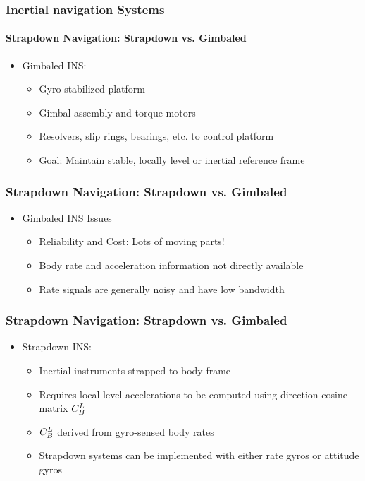 \begin{frame}
\frametitle{Inertial navigation Systems}
\framesubtitle{Strapdown Navigation:  Strapdown vs. Gimbaled}
\begin{itemize}
  \item Gimbaled INS:
  \begin{itemize}
	\item Gyro stabilized platform
	\item Gimbal assembly and torque motors
	\item Resolvers, slip rings, bearings, etc. to control  platform
	\item Goal: Maintain stable, locally level or inertial reference frame
  \end{itemize}
\end{itemize} 
\end{frame}


\begin{frame}
\frametitle{Strapdown Navigation: Strapdown vs. Gimbaled}
\begin{itemize}
  \item Gimbaled INS Issues
  \begin{itemize}
	\item Reliability and Cost: Lots of moving parts!
	\item Body rate and acceleration information not directly available
	\item Rate signals are generally noisy and have low bandwidth
  \end{itemize}
\end{itemize} 
\end{frame}


\begin{frame}
\frametitle{Strapdown Navigation: Strapdown vs. Gimbaled}
\begin{itemize}
  \item Strapdown INS:
  \begin{itemize}
	\item Inertial instruments strapped to body frame
	\item Requires local level accelerations to be computed using direction cosine matrix $C_{B}^{L}$
	\item $C_{B}^{L}$ derived from gyro-sensed body rates
    \item Strapdown systems can be implemented with either rate gyros or attitude gyros 
  \end{itemize} 
\end{itemize} 
\end{frame}

